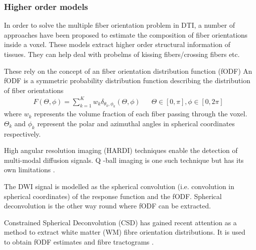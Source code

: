 \documentclass[msthesis.tex]{subfiles}
\begin{document}
\subsubsection{Higher order models}

In order to solve the multiple fiber orientation problem in DTI, a number of approaches have been proposed to estimate the composition of fiber orientations inside a voxel. These models extract higher order structural information of tissues. They can help deal with probelms of kissing fibers/crossing fibers etc.

These rely on the concept of an fiber orientation distribution function (fODF)
An fODF is a symmetric probability distribution function describing the distribution of fiber orientations
\begin{align}
  F(\Theta, \phi) = \sum_{k=1}^{K} w_k \delta_{\theta_k, \phi_k}(\Theta, \phi) &
 & \Theta \in [0, \pi], \phi \in [0,2\pi]
\end{align}
where $w_k$ represents the volume fraction of each fiber passing through the voxel. $\Theta_k$ and $\phi_k$ represent the polar and azimuthal angles in spherical coordinates respectively.

High angular resolution imaging (HARDI) techniques enable the detection of multi-modal diffusion signals. Q -ball imaging is one such technique but has its own limitations \cite{TOURNIER20041176}.

The DWI signal is modelled as the spherical convolution (i.e. convolution in spherical coordinates) of the response function and the fODF. Spherical deconvolution is the other way round where fODF can be extracted.

Constrained Spherical Deconvolution (CSD) has gained recent attention as a method to extract white matter (WM) fibre orientation distributions. It is used to obtain fODF estimates and fibre tractograms \cite{JEURISSEN2014411}.
\end{document}
